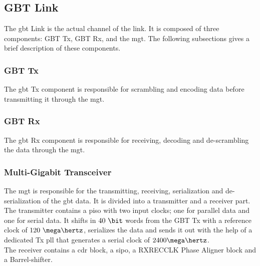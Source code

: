 \documentclass[main.tex]{subfiles}
\begin{document}
\subsection{GBT Link}
The \gls{gbt} Link is the actual channel of the link. It is composed of three components: GBT Tx, GBT Rx, and the \gls{mgt}. The following subsections gives a brief description of these components.

\subsubsection{GBT Tx}

The \gls{gbt} Tx component is responsible for scrambling and encoding data before transmitting it through the \gls{mgt}.

\subsubsection{GBT Rx}

The \gls{gbt} Rx component is responsible for receiving, decoding and de-scrambling the data through the \gls{mgt}.

\subsubsection{Multi-Gigabit Transceiver}
The \gls{mgt} is responsible for the transmitting, receiving, serialization and de-serialization of the \gls{gbt} data. It is divided into a transmitter and a receiver part.\\ The transmitter contains a \gls{piso} with two input clocks; one for parallel data and one for serial data. It shifts in $40~\bit$ words from the GBT Tx with a reference clock of $120~\mega\hertz$, serializes the data and sends it out with the help of a dedicated Tx \gls{pll} that generates a serial clock of $2400 \mega\hertz$.\\ The receiver contains a \gls{cdr} block, a \gls{sipo}, a RXRECCLK Phase Aligner block and a Barrel-shifter. 



\end{document}
